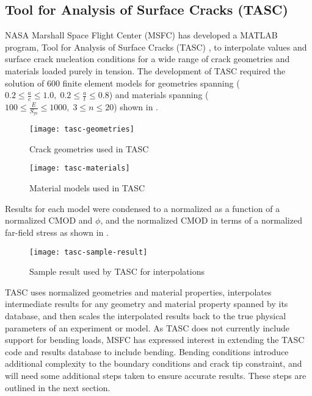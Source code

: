 \subsection{Tool for Analysis of Surface Cracks (TASC)}

NASA Marshall Space Flight Center (MSFC) has developed a MATLAB program, Tool for Analysis of Surface Cracks (TASC) \citep{allenwells2014, tasc}, to interpolate \J values and surface crack nucleation conditions for a wide range of crack geometries and materials loaded purely in tension.
The development of TASC required the solution of 600 finite element models for geometries spanning
 (\(0.2 \leq \frac{a}{c} \leq 1.0,\; 0.2 \leq \frac{a}{t} \leq 0.8\)) and materials spanning (\(100 \leq \frac{E}{S_{\text{ys}}} \leq 1000,\; 3 \leq n \leq 20\)) shown in .
\begin{figure}
\centering
\texttt{[image: tasc-geometries]}
\caption[Crack geometries used in TASC]{\label{fig:tasc-geometries} Crack geometries used in TASC \citep{allenwells2014}}
\end{figure}
\begin{figure}
\centering
\texttt{[image: tasc-materials]}
\caption[Material models used in TASC]{\label{fig:tasc-materials} Material models used in TASC \citep{allenwells2014}}
\end{figure}
Results for each model were condensed to a normalized \J as a function of a normalized CMOD and \(\phi\), and the normalized CMOD in terms of a normalized far-field stress as shown in .
\begin{figure}
\centering
\texttt{[image: tasc-sample-result]}
\caption[Sample result used by TASC for interpolations]{\label{fig:tasc-sample-result} Sample result used by TASC for interpolations \citep{allenwells2014}}
\end{figure}
TASC uses normalized geometries and material properties, interpolates intermediate results for any geometry and material property spanned by its database, and then scales the interpolated results back to the true physical parameters of an experiment or model.
As TASC does not currently include support for bending loads, MSFC has expressed interest in extending the TASC code and results database to include bending.
Bending conditions introduce additional complexity to the boundary conditions and crack tip constraint, and will need some additional steps taken to ensure accurate results.
These steps are outlined in the next section.
\FloatBarrier
